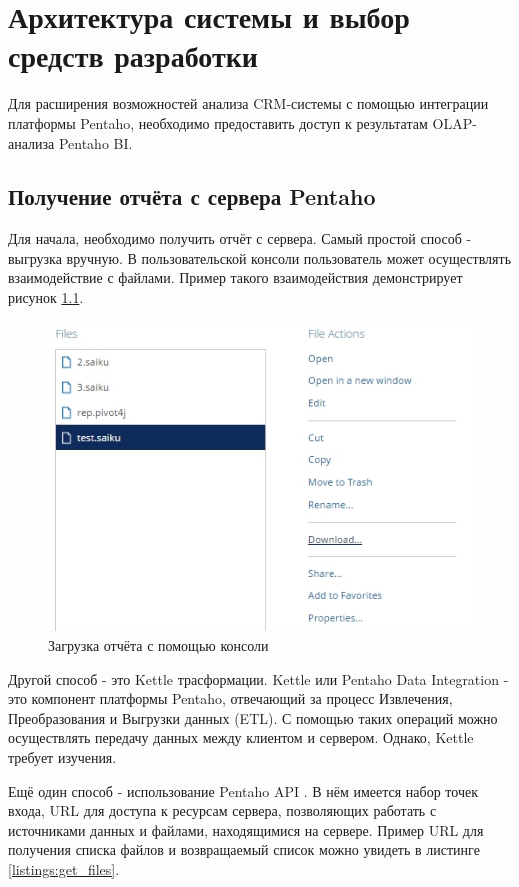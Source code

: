 \chapter{Архитектура системы и выбор средств разработки}

Для расширения возможностей анализа CRM-системы с помощью интеграции платформы Pentaho, необходимо предоставить доступ к результатам OLAP-анализа Pentaho BI.

\section{Получение отчёта с сервера Pentaho}

Для начала, необходимо получить отчёт с сервера. Самый простой способ - выгрузка вручную. В пользовательской консоли пользователь может осуществлять взаимодействие с файлами. Пример такого взаимодействия демонстрирует рисунок \ref{fig:load_analysis}.

\begin{figure}[htbp]
	\centering
	\includegraphics[width=.9\textwidth]{fig/chapter_3/load_analysis}
	\caption{Загрузка отчёта с помощью консоли}
	\label{fig:load_analysis}
\end{figure}

Другой способ - это Kettle трасформации. Kettle или Pentaho Data Integration - это компонент платформы Pentaho, отвечающий за процесс Извлечения, Преобразования и Выгрузки данных (ETL). С помощью таких операций можно осуществлять передачу данных между клиентом и сервером. Однако, Kettle требует изучения.

Ещё один способ - использование Pentaho API \cite{pentahoDocs}. В нём имеется набор точек входа, URL для доступа к ресурсам сервера, позволяющих работать с источниками данных и файлами, находящимися на сервере. Пример URL для получения списка файлов и возвращаемый список можно увидеть в листинге \ref{listings:get_files}.

